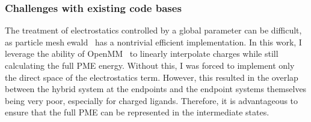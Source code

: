 \subsubsection{Challenges with existing code bases}
%
The treatment of electrostatics controlled by a global parameter can be difficult, as particle mesh ewald~\cite{Darden1993} has a nontrivial efficient implementation. 
%
In this work, I leverage the ability of OpenMM~\cite{Eastman2017} to linearly interpolate charges while still calculating the full PME energy.
%
Without this, I was forced to implement only the direct space of the electrostatics term.
%
However, this resulted in the overlap between the hybrid system at the endpoints and the endpoint systems themselves being very poor, especially for charged ligands.
%
Therefore, it is advantageous to ensure that the full PME can be represented in the intermediate states.
%
